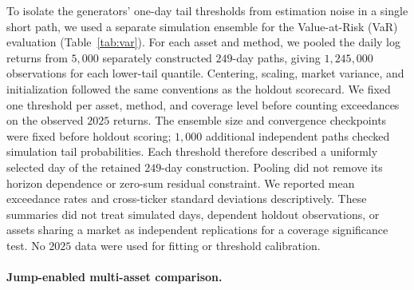 To isolate the generators' one-day tail thresholds from estimation
noise in a single short path, we used a separate simulation ensemble
for the Value-at-Risk (VaR) evaluation (Table~\ref{tab:var}). For each
asset and method, we pooled the daily log returns from $5{,}000$
separately constructed $249$-day paths, giving $1{,}245{,}000$
observations for each lower-tail quantile. Centering, scaling, market
variance, and initialization followed the same conventions as the
holdout scorecard. We fixed one threshold per asset, method, and
coverage level before counting exceedances on the observed $2025$
returns. The ensemble size and convergence checkpoints were fixed
before holdout scoring; $1{,}000$ additional independent paths checked
simulation tail probabilities. Each threshold therefore described a
uniformly selected day of the retained $249$-day construction. Pooling
did not remove its horizon dependence or zero-sum residual constraint.
We reported mean exceedance rates and cross-ticker standard deviations
descriptively. These summaries did not treat simulated days, dependent
holdout observations, or assets sharing a market as independent
replications for a coverage significance test. No $2025$ data were
used for fitting or threshold calibration.


\paragraph{Jump-enabled multi-asset comparison.}

